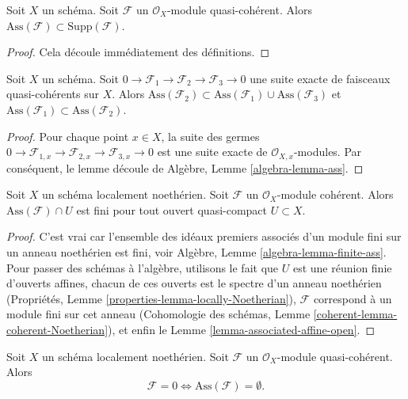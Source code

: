 \begin{lemma}
\label{lemma-ass-support}
Soit  $X$  un schéma. Soit  $\mathcal{F}$  un  $\mathcal{O}_X$-module
quasi-cohérent. Alors  $\text{Ass}(\mathcal{F}) \subset \text{Supp}(\mathcal{F})$.
\end{lemma}

\begin{proof}
Cela découle immédiatement des définitions.
\end{proof}

\begin{lemma}
\label{lemma-ses-ass}
Soit  $X$  un schéma. Soit  $0 \to \mathcal{F}_1 \to \mathcal{F}_2 \to \mathcal{F}_3 \to 0$  une suite exacte de
faisceaux quasi-cohérents sur  $X$. Alors  $\text{Ass}(\mathcal{F}_2) \subset
\text{Ass}(\mathcal{F}_1) \cup \text{Ass}(\mathcal{F}_3)$  et  $\text{Ass}(\mathcal{F}_1) \subset \text{Ass}(\mathcal{F}_2)$.
\end{lemma}

\begin{proof}
Pour chaque point  $x \in X$, la suite des germes  $0 \to \mathcal{F}_{1, x} \to \mathcal{F}_{2, x} \to \mathcal{F}_{3, x} \to 0$  est une suite
exacte de  $\mathcal{O}_{X, x}$-modules. Par conséquent, le lemme découle de
Algèbre, Lemme  \ref{algebra-lemma-ass}.
\end{proof}

\begin{lemma}
\label{lemma-finite-ass}
Soit  $X$  un schéma localement noethérien. Soit  $\mathcal{F}$  un
 $\mathcal{O}_X$-module cohérent. Alors  $\text{Ass}(\mathcal{F}) \cap U$  est fini pour tout ouvert
quasi-compact  $U \subset X$.
\end{lemma}

\begin{proof}
C'est vrai car l'ensemble des idéaux premiers associés d'un module fini sur un
anneau noethérien est fini, voir Algèbre, Lemme  \ref{algebra-lemma-finite-ass}. Pour passer des
schémas à l'algèbre, utilisons le fait que  $U$  est une réunion finie d'ouverts
affines, chacun de ces ouverts est le spectre d'un anneau noethérien (Propriétés,
Lemme  \ref{properties-lemma-locally-Noetherian}),  $\mathcal{F}$  correspond à un module fini sur cet anneau
(Cohomologie des schémas, Lemme  \ref{coherent-lemma-coherent-Noetherian}), et enfin le Lemme
 \ref{lemma-associated-affine-open}.
\end{proof}

\begin{lemma}
\label{lemma-ass-zero}
Soit  $X$  un schéma localement noethérien. Soit  $\mathcal{F}$  un
 $\mathcal{O}_X$-module quasi-cohérent. Alors
$$
\mathcal{F} = 0 \Leftrightarrow \text{Ass}(\mathcal{F}) = \emptyset.
$$
\end{lemma}


